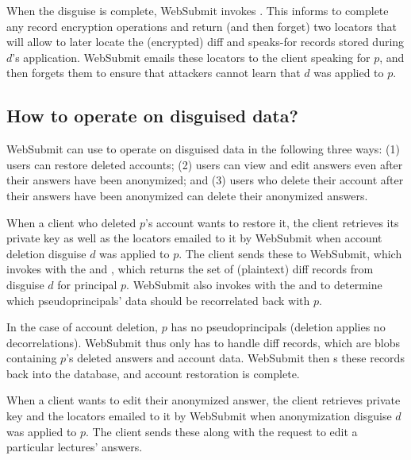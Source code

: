 When the disguise is complete, WebSubmit invokes . This informs \sys to complete any
record encryption operations and return (and then forget) two locators  that will allow \sys
to later locate the (encrypted) diff and speaks-for records stored during $d$'s application.
%
WebSubmit emails these locators to the client speaking for $p$, and then forgets them to ensure that
attackers cannot learn that $d$ was applied to $p$.

\subsection{How to operate on disguised data?}
\label{s:op-disg}

WebSubmit can use \sys to operate on disguised data in the following three ways: (1) users can
restore deleted accounts; (2) users can view and edit answers even after their answers have been
anonymized; and (3) users who delete their account after their answers have been anonymized can
delete their anonymized answers.

When a client who deleted $p$'s account wants to restore it, the client retrieves its private key
 as well as the locators  emailed to it by WebSubmit when account deletion disguise $d$ was applied to $p$. 
The client sends these to WebSubmit, which invokes  with the  and , which returns the set of (plaintext) diff records from disguise $d$ for principal $p$. 
WebSubmit also invokes  with the  and  to determine which
pseudoprincipals' data should be recorrelated back with $p$.

In the case of account deletion, $p$ has no pseudoprincipals (deletion applies no decorrelations).
WebSubmit thus only has to handle diff records, which are blobs containing $p$'s deleted answers and
account data.  WebSubmit then s these records back into the database, and account
restoration is complete. 

When a client wants to edit their anonymized answer, the client retrieves private key
 and the locators  emailed to it by WebSubmit when anonymization disguise $d$ was
applied to $p$. The client sends these along with the request to edit a particular lectures'
answers. 

